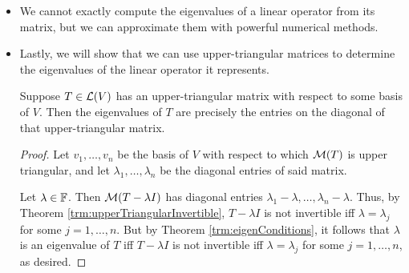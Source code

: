 \documentclass[../main.tex]{subfiles}
\begin{document}
\begin{itemize}
\begin{theorem}
\begin{proof}
            \begin{align*}
                Tv_1 &= \lambda_1v_1+0v_2+\cdots+0v_n\\
                v_1 &= T(v_1/\lambda_1) \in \range T
            \end{align*}
            Similarly, we have that
            \begin{align*}
                Tv_2 &= av_1+\lambda_2v_2+0v_3+\cdots+0v_n\\
                v_2 &= T(v_2/\lambda_2)-\frac{a}{\lambda_2}v_1 \in \range T
            \end{align*}
            since $T(v_2/\lambda_2)$ clearly and linear combinations of $v_1$ are elements of $\range T$ by the previous result. We may analogously prove that $v_3,\dots,v_n\in\range T$, as desired.
        \end{proof}
    \end{theorem}
    \item We cannot exactly compute the eigenvalues of a linear operator from its matrix, but we can approximate them with powerful numerical methods.
    \item Lastly, we will show that we can use upper-triangular matrices to determine the eigenvalues of the linear operator it represents.
    \begin{theorem}\label{trm:upperTriangularEigenvalues}
        Suppose $T\in\mathcal{L}(V)$ has an upper-triangular matrix with respect to some basis of $V$. Then the eigenvalues of $T$ are precisely the entries on the diagonal of that upper-triangular matrix.
        \begin{proof}
            Let $v_1,\dots,v_n$ be the basis of $V$ with respect to which $\mathcal{M}(T)$ is upper triangular, and let $\lambda_1,\dots,\lambda_n$ be the diagonal entries of said matrix.\par
            Let $\lambda\in\mathbb{F}$. Then $\mathcal{M}(T-\lambda I)$ has diagonal entries $\lambda_1-\lambda,\dots,\lambda_n-\lambda$. Thus, by Theorem \ref{trm:upperTriangularInvertible}, $T-\lambda I$ is not invertible iff $\lambda=\lambda_j$ for some $j=1,\dots,n$. But by Theorem \ref{trm:eigenConditions}, it follows that $\lambda$ is an eigenvalue of $T$ iff $T-\lambda I$ is not invertible iff $\lambda=\lambda_j$ for some $j=1,\dots,n$, as desired.
        \end{proof}
    \end{theorem}
\end{itemize}
\end{document}
